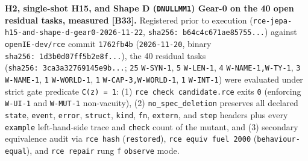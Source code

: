 \documentclass[10pt,letterpaper]{article}
\begin{document}
\textbf{H2, single-shot H15, and Shape D (\texttt{DNULLMM1}) Gear-0 on
the 40 open residual tasks, measured {[}B33{]}.} Registered prior to
execution (\texttt{rce-\allowbreak{}jepa-\allowbreak{}h15-\allowbreak{}and-\allowbreak{}shape-\allowbreak{}d-\allowbreak{}gear0-\allowbreak{}2026-\allowbreak{}11-\allowbreak{}22},
\texttt{sha256:\ b64c4c67\allowbreak{}1ae85755.\allowbreak{}.\allowbreak{}.\allowbreak{}}) against \texttt{openIE-\allowbreak{}dev/\allowbreak{}rce}
commit \texttt{1762fb4b} (\texttt{2026-\allowbreak{}11-\allowbreak{}20}, binary
\texttt{sha256:\ 1d3b0d07\allowbreak{}ff5b2e8f.\allowbreak{}.\allowbreak{}.\allowbreak{}}), the 40 residual tasks
(\texttt{sha256:\ 3ca3a327\allowbreak{}69145e9b.\allowbreak{}.\allowbreak{}.\allowbreak{}}; \texttt{25} \texttt{W-SYN-1},
\texttt{5} \texttt{W-LEN-1}, \texttt{4} \texttt{W-\allowbreak{}NAME-\allowbreak{}1,\allowbreak{}W-\allowbreak{}TY-\allowbreak{}1},
\texttt{3} \texttt{W-NAME-1}, \texttt{1} \texttt{W-WORLD-1}, \texttt{1}
\texttt{W-\allowbreak{}CAP-\allowbreak{}3,\allowbreak{}W-\allowbreak{}WORLD-\allowbreak{}1}, \texttt{1} \texttt{W-INT-1}) were evaluated
under strict gate predicate \texttt{C(\allowbreak{}z)\ =\ 1}: (1)
\texttt{rce\ check\ candidate.\allowbreak{}rce} exits \texttt{0} (enforcing
\texttt{W-UI-1} and \texttt{W-MUT-1} non-vacuity), (2)
\texttt{no\_\allowbreak{}spec\_\allowbreak{}deletion} preserves all declared \texttt{state},
\texttt{event}, \texttt{error}, \texttt{struct}, \texttt{kind},
\texttt{fn}, \texttt{extern}, and \texttt{step} headers plus every
\texttt{example} left-hand-side trace and \texttt{check} count of the
mutant, and (3) secondary equivalence audit via \texttt{rce\ hash}
(\texttt{restored}), \texttt{rce\ equiv\ fuel\ 2000}
(\texttt{behaviour-\allowbreak{}equal}), and \texttt{rce\ repair} rung \texttt{f}
\texttt{observe} mode.
\end{document}
